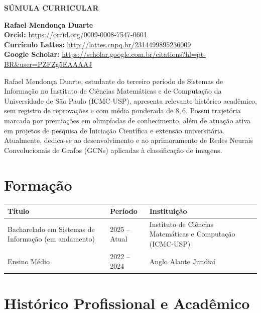 \documentclass[a4paper,10pt]{article}
\begin{document}
\begin{center}
\Large
\textbf{SÚMULA CURRICULAR}
\end{center}
\vspace{4mm}

\textsf{\textbf{Rafael Mendonça Duarte}} \\
\textbf{Orcid:} \url{https://orcid.org/0009-0008-7547-0601} \\
\textbf{Currículo Lattes:} \url{http://lattes.cnpq.br/2314499895236009} \\
\textbf{Google Scholar:} \url{https://scholar.google.com.br/citations?hl=pt-BR&user=PZFZg5EAAAAJ}

Rafael Mendonça Duarte, estudante do terceiro período de Sistemas de Informação no Instituto de Ciências Matemáticas e de Computação da Universidade de São Paulo (ICMC-USP), apresenta relevante histórico acadêmico, sem registro de reprovações e com média ponderada de $8,6$. Possui trajetória marcada por premiações em olimpíadas de conhecimento, além de atuação ativa em projetos de pesquisa de Iniciação Científica e extensão universitária. Atualmente, dedica-se ao desenvolvimento e ao aprimoramento de Redes Neurais Convolucionais de Grafos (GCNs) aplicadas à classificação de imagens.

\section{Formação}
\vspace{-2mm}

\begin{table}[ht!]
    \centering
    \begin{tabularx}{\textwidth}{|X|l|X|}
        \hline
         \textbf{Título} & \textbf{Período} & \textbf{Instituição} \\
         \hline
         Bacharelado em Sistemas de Informação (em andamento) & 2025 – Atual & Instituto de Ciências Matemáticas e Computação (ICMC-USP) \\
         Ensino Médio & 2022 – 2024 & Anglo Alante Jundiaí \\
         \hline
    \end{tabularx}

\end{table}
\vspace{-4mm}

\section{Histórico Profissional e Acadêmico}
\end{document}
